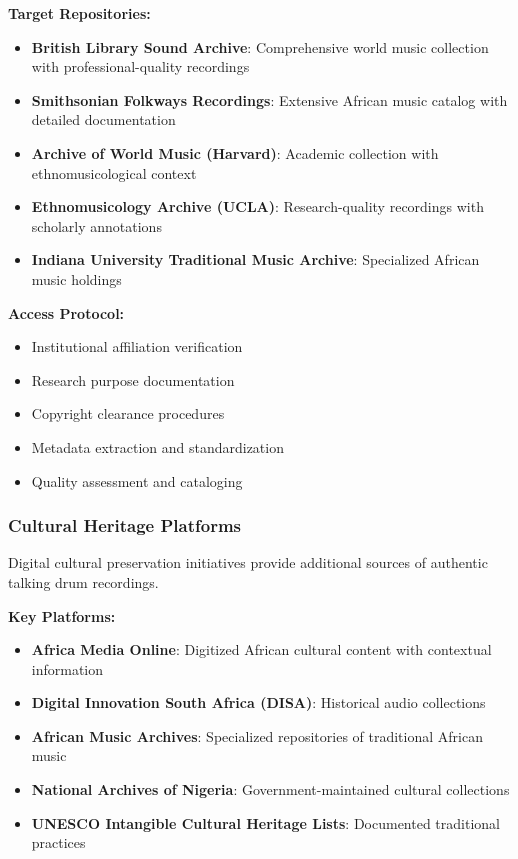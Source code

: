 \documentclass[12pt]{article}
\begin{document}
\textbf{Target Repositories:}
\begin{itemize}
    \item \textbf{British Library Sound Archive}: Comprehensive world music collection with professional-quality recordings
    \item \textbf{Smithsonian Folkways Recordings}: Extensive African music catalog with detailed documentation
    \item \textbf{Archive of World Music (Harvard)}: Academic collection with ethnomusicological context
    \item \textbf{Ethnomusicology Archive (UCLA)}: Research-quality recordings with scholarly annotations
    \item \textbf{Indiana University Traditional Music Archive}: Specialized African music holdings
\end{itemize}

\textbf{Access Protocol:}
\begin{itemize}
    \item Institutional affiliation verification
    \item Research purpose documentation
    \item Copyright clearance procedures
    \item Metadata extraction and standardization
    \item Quality assessment and cataloging
\end{itemize}

\subsubsection{Cultural Heritage Platforms}
Digital cultural preservation initiatives provide additional sources of authentic talking drum recordings.

\textbf{Key Platforms:}
\begin{itemize}
    \item \textbf{Africa Media Online}: Digitized African cultural content with contextual information
    \item \textbf{Digital Innovation South Africa (DISA)}: Historical audio collections
    \item \textbf{African Music Archives}: Specialized repositories of traditional African music
    \item \textbf{National Archives of Nigeria}: Government-maintained cultural collections
    \item \textbf{UNESCO Intangible Cultural Heritage Lists}: Documented traditional practices
\end{itemize}
\end{document}
